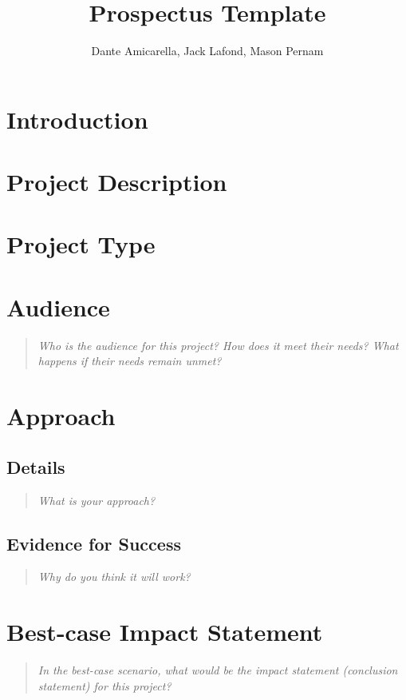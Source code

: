\documentclass{proc}
\begin{document}
\title{Prospectus Template}

\author{Dante Amicarella, Jack Lafond, Mason Pernam}

\maketitle

\section{Introduction}

\section{Project Description}

\section{Project Type}

\section{Audience} 
\begin{quote}
\textit{Who is the audience for this project? 
How does it meet their needs? 
What happens if their needs remain unmet?}
\end{quote}

\section{Approach}
\subsection{Details}
\begin{quote}
\textit{What is your approach?}
\end{quote}

\subsection{Evidence for Success}
\begin{quote}
\textit{Why do you think it will work?} 
\end{quote}


\section{Best-case Impact Statement}
\begin{quote}
\textit{In the best-case scenario, what would be the impact statement (conclusion statement) for this project? \cite{wijk2005value, pike2009science}}
\end{quote}
\end{document}
